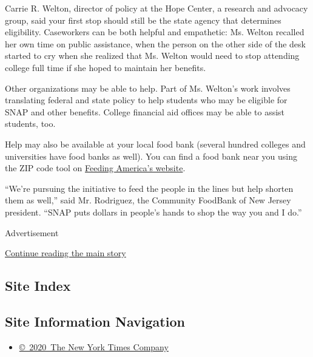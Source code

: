 Carrie R. Welton, director of policy at the Hope Center, a research and
advocacy group, said your first stop should still be the state agency
that determines eligibility. Caseworkers can be both helpful and
empathetic: Ms. Welton recalled her own time on public assistance, when
the person on the other side of the desk started to cry when she
realized that Ms. Welton would need to stop attending college full time
if she hoped to maintain her benefits.

Other organizations may be able to help. Part of Ms. Welton's work
involves translating federal and state policy to help students who may
be eligible for SNAP and other benefits. College financial aid offices
may be able to assist students, too.

Help may also be available at your local food bank (several hundred
colleges and universities have food banks as well). You can find a food
bank near you using the ZIP code tool on
\href{https://www.feedingamerica.org/find-your-local-foodbank}{Feeding
America's website}.

``We're pursuing the initiative to feed the people in the lines but help
shorten them as well,'' said Mr. Rodriguez, the Community FoodBank of
New Jersey president. ``SNAP puts dollars in people's hands to shop the
way you and I do.''

Advertisement

\protect\hyperlink{after-bottom}{Continue reading the main story}

\hypertarget{site-index}{%
\subsection{Site Index}\label{site-index}}

\hypertarget{site-information-navigation}{%
\subsection{Site Information
Navigation}\label{site-information-navigation}}

\begin{itemize}
\tightlist
\item
  \href{https://help.nytimes.com/hc/en-us/articles/115014792127-Copyright-notice}{©~2020~The
  New York Times Company}
\end{itemize}

